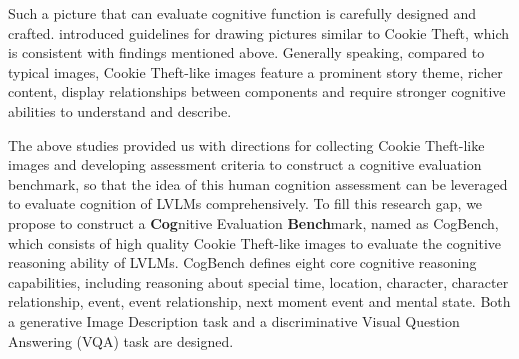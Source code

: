 Such a picture that can evaluate cognitive function is carefully designed and crafted.
\citet{tasnim-etal-2022-depac} introduced guidelines for drawing pictures similar to Cookie Theft, which is consistent with findings mentioned above.
Generally speaking, compared to typical images, Cookie Theft-like images feature a prominent story theme, richer content, display relationships between components and require stronger cognitive abilities to understand and describe.

The above studies provided us with directions for collecting Cookie Theft-like images and developing assessment criteria to construct a cognitive evaluation benchmark, so that the idea of this human cognition assessment can be leveraged to evaluate cognition of LVLMs comprehensively.
To fill this research gap, we propose to construct a \textbf{Cog}nitive Evaluation \textbf{Bench}mark, named as CogBench, which consists of high quality Cookie Theft-like images to evaluate the cognitive reasoning ability of LVLMs. 
CogBench defines eight core cognitive reasoning capabilities, including reasoning about special time, location, character, character relationship, event, event relationship, next moment event and mental state. 
Both a generative Image Description task and a discriminative Visual Question Answering (VQA) task are designed.

